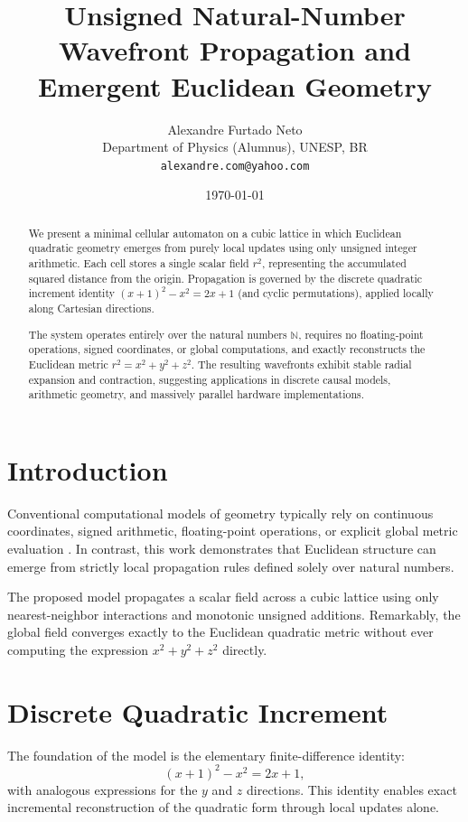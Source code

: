 \documentclass[11pt,a4paper]{article}
\title{
Unsigned Natural-Number Wavefront Propagation
and Emergent Euclidean Geometry
}
\author{
Alexandre Furtado Neto\\
Department of Physics (Alumnus), UNESP, BR\\
\texttt{alexandre.com@yahoo.com}
}
\date{\today}
\begin{document}
\maketitle

\begin{abstract}
We present a minimal cellular automaton on a cubic lattice in which Euclidean quadratic geometry emerges from purely local updates using only unsigned integer arithmetic. Each cell stores a single scalar field \(r^2\), representing the accumulated squared distance from the origin. Propagation is governed by the discrete quadratic increment identity \((x+1)^2 - x^2 = 2x + 1\) (and cyclic permutations), applied locally along Cartesian directions.

The system operates entirely over the natural numbers \(\mathbb{N}\), requires no floating-point operations, signed coordinates, or global computations, and exactly reconstructs the Euclidean metric \(r^2 = x^2 + y^2 + z^2\). The resulting wavefronts exhibit stable radial expansion and contraction, suggesting applications in discrete causal models, arithmetic geometry, and massively parallel hardware implementations.
\end{abstract}

\section{Introduction}
Conventional computational models of geometry typically rely on continuous coordinates, signed arithmetic, floating-point operations, or explicit global metric evaluation \cite{danielsson1980,sethian1996}. In contrast, this work demonstrates that Euclidean structure can emerge from strictly local propagation rules defined solely over natural numbers.

The proposed model propagates a scalar field across a cubic lattice using only nearest-neighbor interactions and monotonic unsigned additions. Remarkably, the global field converges exactly to the Euclidean quadratic metric without ever computing the expression \(x^2 + y^2 + z^2\) directly.

\section{Discrete Quadratic Increment}

The foundation of the model is the elementary finite-difference identity:
\[
(x+1)^2 - x^2 = 2x + 1,
\]
with analogous expressions for the \(y\) and \(z\) directions. This identity enables exact incremental reconstruction of the quadratic form through local updates alone.
\end{document}
